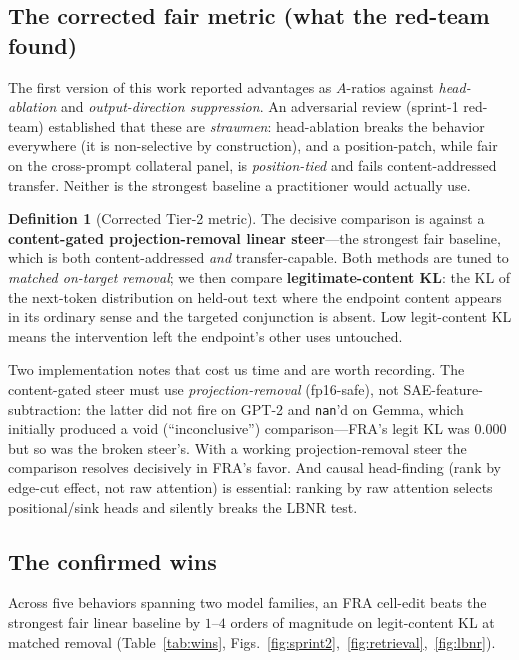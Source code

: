 \documentclass[11pt]{article}
\theoremstyle{definition}
\newtheorem{definition}{Definition}
\theoremstyle{plain}
\theoremstyle{remark}
\begin{document}
\subsection{The corrected fair metric (what the red-team found)}\label{sec:metric}

The first version of this work reported advantages as $A$-ratios against \emph{head-ablation} and \emph{output-direction suppression}. An adversarial review (sprint-1 red-team) established that these are \emph{strawmen}: head-ablation breaks the behavior everywhere (it is non-selective by construction), and a position-patch, while fair on the cross-prompt collateral panel, is \emph{position-tied} and fails content-addressed transfer. Neither is the strongest baseline a practitioner would actually use.

\begin{definition}[Corrected Tier-2 metric]\label{def:metric}
The decisive comparison is against a \textbf{content-gated projection-removal linear steer}---the strongest fair baseline, which is both content-addressed \emph{and} transfer-capable. Both methods are tuned to \emph{matched on-target removal}; we then compare \textbf{legitimate-content KL}: the KL of the next-token distribution on held-out text where the endpoint content appears in its ordinary sense and the targeted conjunction is absent. Low legit-content KL means the intervention left the endpoint's other uses untouched.
\end{definition}

Two implementation notes that cost us time and are worth recording. The content-gated steer must use \emph{projection-removal} (fp16-safe), not SAE-feature-subtraction: the latter did not fire on GPT-2 and \texttt{nan}'d on Gemma, which initially produced a void (``inconclusive'') comparison---FRA's legit KL was $0.000$ but so was the broken steer's. With a working projection-removal steer the comparison resolves decisively in FRA's favor. And causal head-finding (rank by edge-cut effect, not raw attention) is essential: ranking by raw attention selects positional/sink heads and silently breaks the LBNR test.

\subsection{The confirmed wins}\label{sec:win}

Across five behaviors spanning two model families, an FRA cell-edit beats the strongest fair linear baseline by $1$--$4$ orders of magnitude on legit-content KL at matched removal (Table~\ref{tab:wins}, Figs.~\ref{fig:sprint2},~\ref{fig:retrieval},~\ref{fig:lbnr}).
\end{document}
